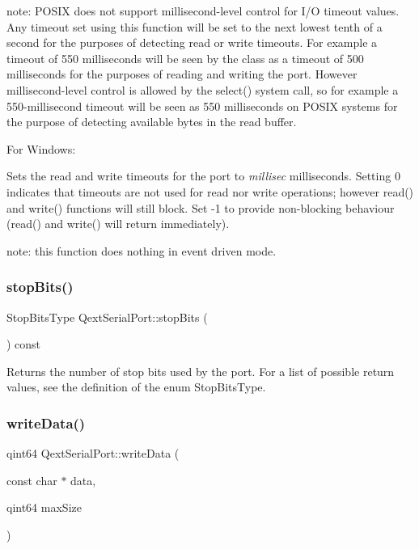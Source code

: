 note\+: P\+O\+S\+IX does not support millisecond-\/level control for I/O timeout values. Any timeout set using this function will be set to the next lowest tenth of a second for the purposes of detecting read or write timeouts. For example a timeout of 550 milliseconds will be seen by the class as a timeout of 500 milliseconds for the purposes of reading and writing the port. However millisecond-\/level control is allowed by the select() system call, so for example a 550-\/millisecond timeout will be seen as 550 milliseconds on P\+O\+S\+IX systems for the purpose of detecting available bytes in the read buffer.

For Windows\+:

Sets the read and write timeouts for the port to {\itshape millisec} milliseconds. Setting 0 indicates that timeouts are not used for read nor write operations; however read() and write() functions will still block. Set -\/1 to provide non-\/blocking behaviour (read() and write() will return immediately).

note\+: this function does nothing in event driven mode. \mbox{\label{classQextSerialPort_a9a135f5caefdad23e1a2dbd7ce7b8731}} 
\subsubsection{\texorpdfstring{stop\+Bits()}{stopBits()}}
{\footnotesize\ttfamily Stop\+Bits\+Type Qext\+Serial\+Port\+::stop\+Bits (\begin{DoxyParamCaption}{ }\end{DoxyParamCaption}) const}

Returns the number of stop bits used by the port. For a list of possible return values, see the definition of the enum Stop\+Bits\+Type. \mbox{\label{classQextSerialPort_a23b32aebe729afd58d7ba6e409d29d1f}} 
\subsubsection{\texorpdfstring{write\+Data()}{writeData()}}
{\footnotesize\ttfamily qint64 Qext\+Serial\+Port\+::write\+Data (\begin{DoxyParamCaption}\item[{const char $\ast$}]{data,  }\item[{qint64}]{max\+Size }\end{DoxyParamCaption})\hspace{0.3cm}{\ttfamily [protected]}}

